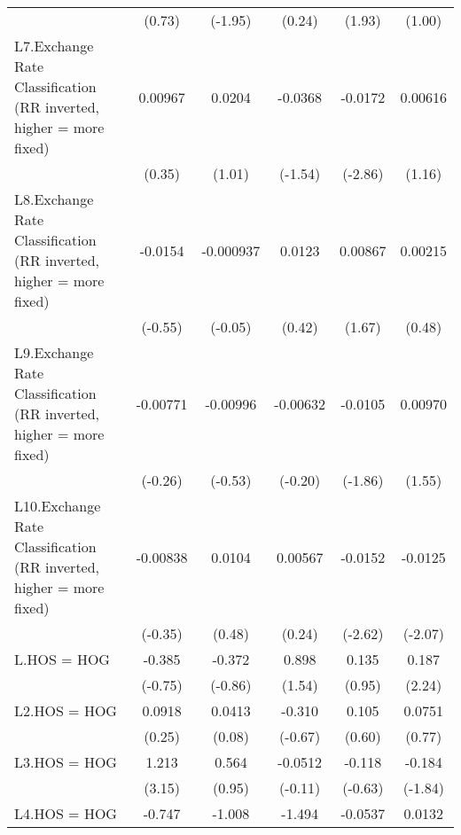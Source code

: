 {\begin{longtable}{l*{5}{c}}
                &   (0.73)         &  (-1.95)         &   (0.24)         &   (1.93)         &   (1.00)         \\
[1em]
L7.Exchange Rate Classification (RR inverted, higher = more fixed)&  0.00967         &   0.0204         &  -0.0368         &  -0.0172\sym{**} &  0.00616         \\
                &   (0.35)         &   (1.01)         &  (-1.54)         &  (-2.86)         &   (1.16)         \\
[1em]
L8.Exchange Rate Classification (RR inverted, higher = more fixed)&  -0.0154         &-0.000937         &   0.0123         &  0.00867         &  0.00215         \\
                &  (-0.55)         &  (-0.05)         &   (0.42)         &   (1.67)         &   (0.48)         \\
[1em]
L9.Exchange Rate Classification (RR inverted, higher = more fixed)& -0.00771         & -0.00996         & -0.00632         &  -0.0105         &  0.00970         \\
                &  (-0.26)         &  (-0.53)         &  (-0.20)         &  (-1.86)         &   (1.55)         \\
[1em]
L10.Exchange Rate Classification (RR inverted, higher = more fixed)& -0.00838         &   0.0104         &  0.00567         &  -0.0152\sym{**} &  -0.0125\sym{*}  \\
                &  (-0.35)         &   (0.48)         &   (0.24)         &  (-2.62)         &  (-2.07)         \\
[1em]
L.HOS = HOG     &   -0.385         &   -0.372         &    0.898         &    0.135         &    0.187\sym{*}  \\
                &  (-0.75)         &  (-0.86)         &   (1.54)         &   (0.95)         &   (2.24)         \\
[1em]
L2.HOS = HOG    &   0.0918         &   0.0413         &   -0.310         &    0.105         &   0.0751         \\
                &   (0.25)         &   (0.08)         &  (-0.67)         &   (0.60)         &   (0.77)         \\
[1em]
L3.HOS = HOG    &    1.213\sym{**} &    0.564         &  -0.0512         &   -0.118         &   -0.184         \\
                &   (3.15)         &   (0.95)         &  (-0.11)         &  (-0.63)         &  (-1.84)         \\
[1em]
L4.HOS = HOG    &   -0.747         &   -1.008\sym{*}  &   -1.494\sym{**} &  -0.0537         &   0.0132         \\

\end{longtable}}
